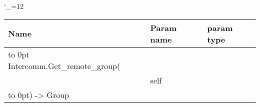 \begingroup \catcode`\_=12 \tt
\begin{tabular}{lll}
\toprule
\textrm{Name}&\textrm{Param name}&\textrm{param type}\\
\midrule
\hbox to 0pt {Intercomm.Get_remote_group(\hss}\\
& self\\
\hbox to 0pt{) -> Group\hss}\\
\bottomrule
\end{tabular}
\endgroup
